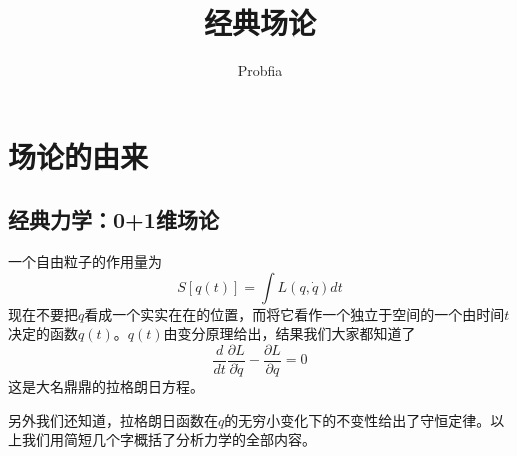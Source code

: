 \documentclass[a4paper,11pt]{ctexart}
\title{经典场论}
\author{Probfia}
\date{}
\newcommand{\beq}{\begin{equation}}
\newcommand{\eeq}{\end{equation}}
\begin{document}
\maketitle
\tableofcontents
\section{场论的由来}
\subsection{经典力学：0+1维场论}
一个自由粒子的作用量为
\beq
S[q(t)] = \int L(q,\dot{q}) dt
\eeq
现在不要把$q$看成一个实实在在的位置，而将它看作一个独立于空间的一个由时间$t$决定的函数$q(t)$。$q(t)$由变分原理给出，结果我们大家都知道了
\beq
\frac{d}{dt} \frac{\partial L}{\partial \dot{q}} - \frac{\partial L}{\partial q} = 0
\eeq
这是大名鼎鼎的拉格朗日方程。
\par
另外我们还知道，拉格朗日函数在$q$的无穷小变化下的不变性给出了守恒定律。以上我们用简短几个字概括了分析力学的全部内容。
\end{document}
